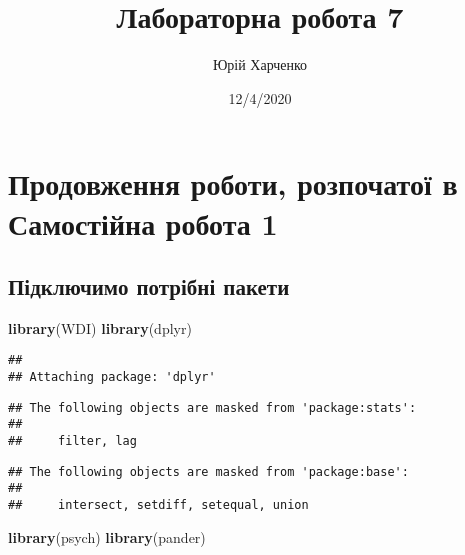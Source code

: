 \documentclass[
]{article}
\title{Лабораторна робота 7}
\author{Юрій Харченко}
\date{12/4/2020}
\newenvironment{Shaded}{\begin{snugshade}}{\end{snugshade}}
\newcommand{\KeywordTok}[1]{\textcolor[rgb]{0.13,0.29,0.53}{\textbf{#1}}}
\newcommand{\NormalTok}[1]{#1}
\begin{document}
\maketitle

\hypertarget{ux43fux440ux43eux434ux43eux432ux436ux435ux43dux43dux44f-ux440ux43eux431ux43eux442ux438-ux440ux43eux437ux43fux43eux447ux430ux442ux43eux457-ux432-ux441ux430ux43cux43eux441ux442ux456ux439ux43dux430-ux440ux43eux431ux43eux442ux430-1}{%
\section{Продовження роботи, розпочатої в Самостійна робота
1}\label{ux43fux440ux43eux434ux43eux432ux436ux435ux43dux43dux44f-ux440ux43eux431ux43eux442ux438-ux440ux43eux437ux43fux43eux447ux430ux442ux43eux457-ux432-ux441ux430ux43cux43eux441ux442ux456ux439ux43dux430-ux440ux43eux431ux43eux442ux430-1}}

\hypertarget{ux43fux456ux434ux43aux43bux44eux447ux438ux43cux43e-ux43fux43eux442ux440ux456ux431ux43dux456-ux43fux430ux43aux435ux442ux438}{%
\subsection{Підключимо потрібні
пакети}\label{ux43fux456ux434ux43aux43bux44eux447ux438ux43cux43e-ux43fux43eux442ux440ux456ux431ux43dux456-ux43fux430ux43aux435ux442ux438}}

\begin{Shaded}
\begin{Highlighting}[]
\KeywordTok{library}\NormalTok{(WDI)}
\KeywordTok{library}\NormalTok{(dplyr)}
\end{Highlighting}
\end{Shaded}

\begin{verbatim}
## 
## Attaching package: 'dplyr'
\end{verbatim}

\begin{verbatim}
## The following objects are masked from 'package:stats':
## 
##     filter, lag
\end{verbatim}

\begin{verbatim}
## The following objects are masked from 'package:base':
## 
##     intersect, setdiff, setequal, union
\end{verbatim}

\begin{Shaded}
\begin{Highlighting}[]
\KeywordTok{library}\NormalTok{(psych)}
\KeywordTok{library}\NormalTok{(pander)}
\end{Highlighting}
\end{Shaded}
\end{document}
